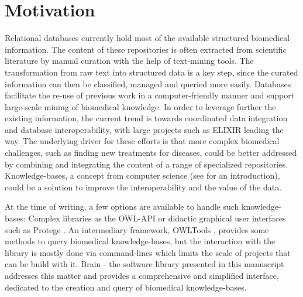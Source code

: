 \documentclass{bioinfo}
\begin{document}
\section{Motivation}
Relational databases currently hold most of the available structured biomedical information. The content of these repositories is often
extracted from scientific literature by manual curation with the help of text-mining tools. The transformation from raw text into
structured data is a key step, since the curated information can then be classified, managed and queried more easily. Databases facilitate
the re-use of previous work in a computer-friendly manner and support large-scale mining of
biomedical knowledge. In order to leverage further
the existing information, the current trend is towards coordinated data integration and database interoperability,
with large projects such as ELIXIR \citep{Crosswell2012} leading the way.
The underlying driver for these efforts is that more complex biomedical challenges, such as finding new treatments for diseases, could be better
addressed by combining and integrating the content of a range of specialized repositories.
Knowledge-bases, a concept from computer science (see \citealp{Krotzsch2012} for an introduction),
could be a solution to improve the interoperability and the value of the data.

At the time of writing, a few options are available to handle such knowledge-bases: Complex
libraries as the OWL-API \citep{MatthewHorridge2011} or didactic graphical user interfaces such as
Protege \citep{StanfordCenterforBiomedicalInformaticsResearch}. An intermediary framework,
OWLTools \citep{MungallC},
provides some methods to query biomedical knowledge-bases, but the interaction with the library is mostly done via command-lines which
limits the scale of projects that can be build with it.
Brain - the software library presented in this manuscript addresses this matter and provides a comprehensive and simplified
interface, dedicated to the creation and query of biomedical knowledge-bases.
\end{document}
